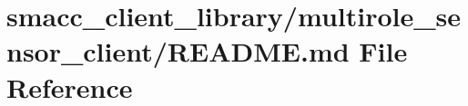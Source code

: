 \hypertarget{smacc__client__library_2multirole__sensor__client_2README_8md}{}\section{smacc\+\_\+client\+\_\+library/multirole\+\_\+sensor\+\_\+client/\+R\+E\+A\+D\+ME.md File Reference}
\label{smacc__client__library_2multirole__sensor__client_2README_8md}

